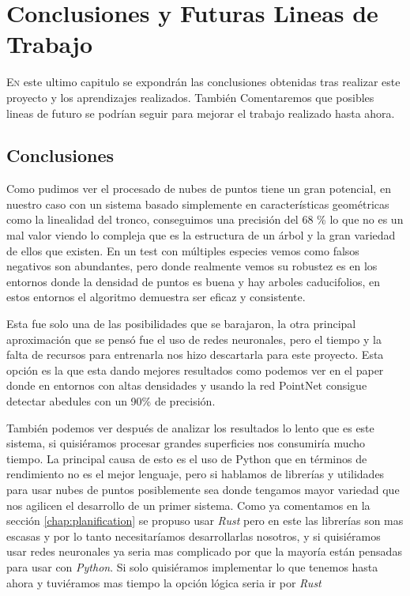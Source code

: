 \chapter{Conclusiones y Futuras Lineas de Trabajo}
\label{chap:conclusions}

\lettrine{E}{n} este ultimo capitulo se expondrán las conclusiones obtenidas tras realizar este proyecto y los aprendizajes realizados. También Comentaremos que posibles lineas de futuro se podrían seguir para mejorar el trabajo realizado hasta ahora.

\section{Conclusiones}
Como pudimos ver el procesado de nubes de puntos tiene un gran potencial, en nuestro caso con un sistema basado simplemente en características geométricas como la linealidad del tronco, conseguimos una precisión del 68 \% lo que no es un mal valor viendo lo compleja que es la estructura de un árbol y la gran variedad de ellos que existen. En un test con múltiples especies vemos como falsos negativos son abundantes, pero donde realmente vemos su robustez es en los entornos donde la densidad de puntos es buena y hay arboles caducifolios, en estos entornos el algoritmo demuestra ser eficaz y consistente. 

Esta fue solo una de las posibilidades que se barajaron, la otra principal aproximación que se pensó fue el uso de redes neuronales, pero el tiempo y la falta de recursos para entrenarla nos hizo descartarla para este proyecto. Esta opción es la que esta dando mejores resultados como podemos ver en el paper \cite{LIU2021109301} donde en entornos con altas densidades y usando la red PointNet consigue detectar abedules con un 90\% de precisión.

También podemos ver después de analizar los resultados lo lento que es este sistema, si quisiéramos procesar grandes superficies nos consumiría mucho tiempo. La principal causa de esto es el uso de Python que en términos de rendimiento no es el mejor lenguaje, pero si hablamos de librerías y utilidades para usar nubes de puntos posiblemente sea donde tengamos mayor variedad que nos agilicen el desarrollo de un primer sistema. Como ya comentamos en la sección \ref{chap:planification} se propuso usar \textit{Rust} pero en este las librerías son mas escasas y por lo tanto necesitaríamos desarrollarlas nosotros, y si quisiéramos usar redes neuronales ya seria mas complicado por que la mayoría están pensadas para usar con \textit{Python}. Si solo quisiéramos implementar lo que tenemos hasta ahora y tuviéramos mas tiempo la opción lógica seria ir por  \textit{Rust}



